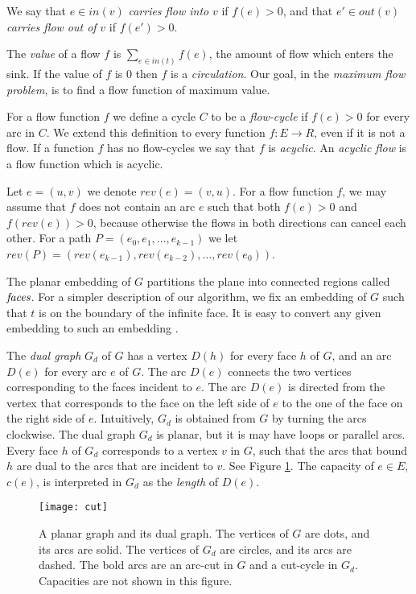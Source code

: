 \documentclass[a4paper,11pt]{article}
\begin{document}
We say that $e \in in(v)$ \emph{carries flow into} $v$ if $f(e) > 0$, and that $e' \in out(v)$ \emph{carries flow out of} $v$ if $f(e') > 0$.

The \emph{value} of a flow $f$ is $\sum_{e \in in(t)} f(e)$, the amount of flow which enters the sink. If the value of $f$ is $0$ then $f$ is a \emph{circulation}. Our goal, in the \emph{maximum flow problem}, is to find a  flow function of maximum value.

For a flow function $f$ we define a
 cycle $C$  to be
a \emph{flow-cycle} if $f(e) > 0$ for every arc in
$C$.
We extend this definition to every function $f: E \to R$, even if it is not a flow.
If a function $f$ has no flow-cycles we say that $f$ is {\em acyclic}.
 An \emph{acyclic flow} is a  flow function
which is acyclic.

Let $e = (u, v)$ we denote $rev(e) = (v, u)$.
For a flow function $f$, we may assume that $f$ does not contain an arc $e$ such that
both $f(e) > 0$ and $f(rev(e)) > 0$, because otherwise the flows in both directions can cancel each other.
For a path $P = (e_0, e_1, \dots, e_{k-1})$ we let $rev(P) = (rev(e_{k-1}), rev(e_{k-2}), \dots, rev(e_0))$.

The planar embedding of $G$ partitions the plane into connected
regions called $\emph{faces}$.
For a simpler description of our algorithm, we fix an embedding of $G$
such that $t$ is on the boundary of the infinite face.
It is easy to convert any given embedding to such an embedding \cite{NC88}.

The
\emph{dual graph} $G_d$ of $G$ has a vertex $D(h)$ for every  face $h$
of $G$, and an arc
$D(e)$ for every arc $e$ of $G$. The arc $D(e)$ connects the two vertices
corresponding to the faces incident to $e$. The arc $D(e)$ is directed from
the vertex that corresponds to the face on the
left side of $e$ to the one of the face on the right side of $e$.
Intuitively, $G_d$ is obtained from $G$ by turning the arcs clockwise.
The dual graph $G_d$ is planar, but it is may have loops or parallel arcs.
Every face $h$ of $G_d$ corresponds to a vertex $v$ in $G$, such that the
arcs that bound $h$ are dual to the arcs that are incident to $v$.
See Figure \ref{fig:Gd}.
The capacity of $e \in E$, $c(e)$, is interpreted in $G_d$ as the \emph{length}
of $D(e)$.

\begin{figure}
    \centering
    \texttt{[image: cut]}
    \caption{A planar graph and its dual graph. The vertices of $G$ are dots, and its arcs are solid. The vertices of $G_d$ are circles, and its arcs are dashed. The bold arcs are an arc-cut in $G$ and a cut-cycle in $G_d$. Capacities are not shown in this figure.}
    \label{fig:Gd}
\end{figure}
\end{document}
